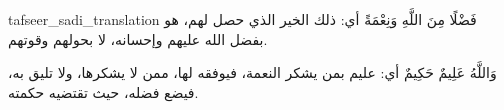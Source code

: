 \begin{taggedblock}{tafseer_sadi_translation}
{ فَضْلًا مِنَ اللَّهِ وَنِعْمَةً }
أي: ذلك الخير الذي حصل لهم، هو بفضل الله عليهم وإحسانه، لا بحولهم وقوتهم.

{ وَاللَّهُ عَلِيمٌ حَكِيمٌ }
أي: عليم بمن يشكر النعمة، فيوفقه لها، ممن لا يشكرها، ولا تليق به، فيضع فضله، حيث تقتضيه حكمته.
\end{taggedblock}

\begin{comment}
Please use the following for footnotes:- Sample\footnoteQ{Text of Qur'an footnote goes here.}.
Sample\footnoteT{Text of Tafseer footnote goes here.}.
\end{comment}